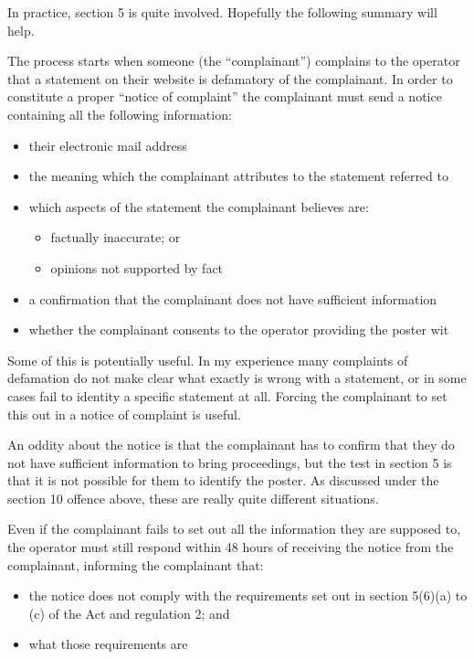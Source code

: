 \documentclass[]{article}
\begin{document}
In practice, section 5 is quite involved. Hopefully the following summary will help.

The process starts when someone (the ``complainant'') complains to the operator that a statement on their website is defamatory of the complainant. In order to constitute a proper ``notice of complaint'' the complainant must send a notice containing all the following information:

\begin{itemize}
\item their electronic mail address
\item the meaning which the complainant attributes to the statement referred to
\item which aspects of the statement the complainant believes are:
  \begin{itemize}
  \item factually inaccurate; or
  \item opinions not supported by fact
  \end{itemize}
\item a confirmation that the complainant does not have sufficient information
\item whether the complainant consents to the operator providing the poster wit
\end{itemize}

Some of this is potentially useful. In my experience many complaints of defamation do not make clear what exactly is wrong with a statement, or in some cases fail to identity a specific statement at all. Forcing the complainant to set this out in a notice of complaint is useful.

An oddity about the notice is that the complainant has to confirm that they do not have sufficient information to bring proceedings, but the test in section 5 is that it is not possible for them to identify the poster. As discussed under the section 10 offence above, these are really quite different situations.

Even if the complainant fails to set out all the information they are supposed to, the operator must still respond within 48 hours of receiving the notice from the complainant, informing the complainant that:

\begin{itemize}
\item the notice does not comply with the requirements set out in section 5(6)(a) to (c) of the Act and regulation 2; and
\item what those requirements are
\end{itemize}
\end{document}
